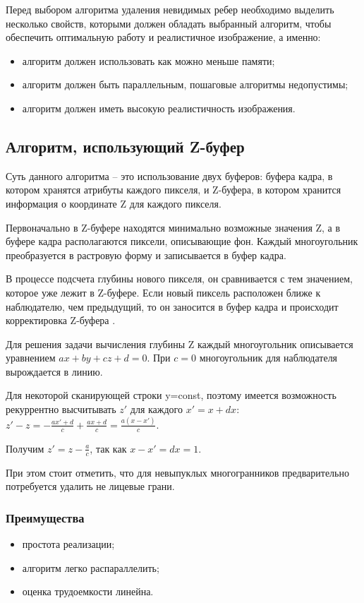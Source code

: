 Перед выбором алгоритма удаления невидимых ребер необходимо выделить несколько свойств, которыми должен обладать выбранный алгоритм, чтобы обеспечить оптимальную работу и реалистичное изображение, а именно:
\begin{itemize}
\item	алгоритм должен использовать как можно меньше памяти;
\item	алгоритм должен быть параллельным, пошаговые алгоритмы недопустимы;
\item	алгоритм должен иметь высокую реалистичность изображения.
\end{itemize}

\subsection{Алгоритм, использующий Z-буфер}
Суть данного алгоритма – это использование двух буферов: буфера кадра, в котором хранятся атрибуты каждого пикселя, и Z-буфера, в котором хранится информация о координате Z для каждого пикселя.

Первоначально в Z-буфере находятся минимально возможные значения Z, а в буфере кадра располагаются пиксели, описывающие фон. Каждый многоугольник преобразуется в растровую форму и записывается в буфер кадра.

В процессе подсчета глубины нового пикселя, он сравнивается с тем значением, которое уже лежит в Z-буфере. Если новый пиксель расположен ближе к наблюдателю, чем предыдущий, то он заносится в буфер кадра и происходит корректировка Z-буфера \cite{zbufer}.

Для решения задачи вычисления глубины Z каждый многоугольник описывается уравнением $ax+by+cz+d=0$. При $c=0$ многоугольник для наблюдателя вырождается в линию. 

Для некоторой сканирующей строки y=const, поэтому имеется возможность рекуррентно высчитывать $z'$ для каждого $x'=x+dx$: $z' - z = - \frac{ax' + d}{c} + \frac{ax + d}{c} = \frac{a(x - x')}{c}$.

Получим $z' = z - \frac{a}{c}$, так как $x - x' = dx = 1$.

При этом стоит отметить, что для невыпуклых многогранников предварительно потребуется удалить не лицевые грани.

\subsubsection*{Преимущества}
\begin{itemize}
	\item простота реализации;
	\item алгоритм легко распараллелить;
	\item оценка трудоемкости линейна.
\end{itemize}
